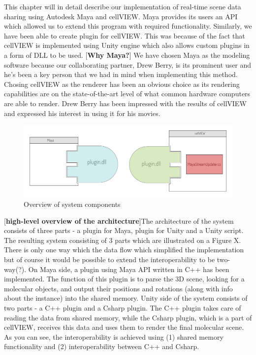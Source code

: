 \documentclass[
  digital, %
  table,   %
  nolof,     %
  nolot,     %
]{fithesis3}
\begin{document}
This chapter will in detail describe our implementation of real-time scene data sharing using Autodesk Maya and cellVIEW. Maya provides its users an API which allowed us to extend this program with required functionality. Similarly, we have been able to create plugin for cellVIEW. This was because of the fact that cellVIEW is implemented using Unity engine which also allows custom plugins in a form of DLL to be used.
[\textbf{Why Maya?}] We have chosen Maya as the modeling software because our collaborating partner, Drew Berry, is its prominent user and he's been a key person that we had in mind when implementing this method. Chosing cellVIEW as the renderer has been an obvious choice as its rendering capabilities are on the state-of-the-art level of what common hardware computers are able to render. Drew Berry has been impressed with the results of cellVIEW and expressed his interest in using it for his movies.

\begin{figure}
  \begin{center}
    \includegraphics[scale=0.8]{images/system-architecture-overview.pdf}
  \end{center}
  \caption{Overview of system components}
  \label{system-overview}
\end{figure}

[\textbf{high-level overview of the architecture}]The architecture of the system consists of three parts - a plugin for Maya, plugin for Unity and a Unity script.
The resulting system consisting of 3 parts which are illustrated on a Figure X. There is only one way which the data flow which simplified the implementation but of course it would be possible to extend the interoperability to be two-way(?).
On Maya side, a plugin using Maya API written in C++ has been implemented. The function of this plugin is to parse the 3D scene, looking for a molecular objects, and output their positions and rotations (along with info about the instance) into the shared memory.
Unity side of the system consists of two parts - a C++ plugin and a Csharp plugin. The C++ plugin takes care of reading the data from shared memory, while the Csharp plugin, which is a part of cellVIEW, receives this data and uses them to render the final molecular scene. As you can see, the interoperability is achieved using (1) shared memory functionality and (2) interoperability between C++ and Csharp.
\end{document}
